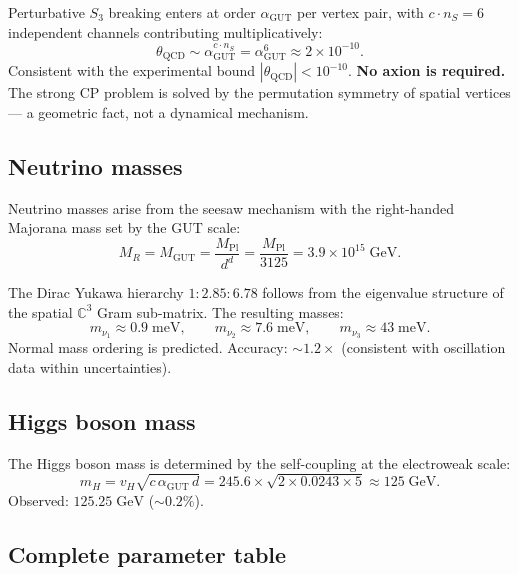 \documentclass[12pt]{article}
\theoremstyle{remark}
\theoremstyle{definition}
\begin{document}
Perturbative $S_3$ breaking enters at order $\alpha_\text{GUT}$ per vertex pair, with $c \cdot n_S = 6$ independent channels contributing multiplicatively:
\begin{equation}
\theta_\text{QCD} \sim \alpha_\text{GUT}^{c \cdot n_S} = \alpha_\text{GUT}^6 \approx 2 \times 10^{-10}.
\end{equation}
Consistent with the experimental bound $|\theta_\text{QCD}| < 10^{-10}$. \textbf{No axion is required.} The strong CP problem is solved by the permutation symmetry of spatial vertices --- a geometric fact, not a dynamical mechanism.

\subsection{Neutrino masses}

Neutrino masses arise from the seesaw mechanism with the right-handed Majorana mass set by the GUT scale:
\begin{equation}
M_R = M_\text{GUT} = \frac{M_\text{Pl}}{d^d} = \frac{M_\text{Pl}}{3125} = 3.9 \times 10^{15}\;\text{GeV}.
\end{equation}

The Dirac Yukawa hierarchy $1 : 2.85 : 6.78$ follows from the eigenvalue structure of the spatial $\mathbb{C}^3$ Gram sub-matrix. The resulting masses:
\begin{equation}
m_{\nu_1} \approx 0.9\;\text{meV}, \qquad m_{\nu_2} \approx 7.6\;\text{meV}, \qquad m_{\nu_3} \approx 43\;\text{meV}.
\end{equation}
Normal mass ordering is predicted. Accuracy: $\sim 1.2\times$ (consistent with oscillation data within uncertainties).

\subsection{Higgs boson mass}

The Higgs boson mass is determined by the self-coupling at the electroweak scale:
\begin{equation}
m_H = v_H\sqrt{c\,\alpha_\text{GUT}\,d} = 245.6 \times \sqrt{2 \times 0.0243 \times 5} \approx 125\;\text{GeV}.
\end{equation}
Observed: $125.25\;\text{GeV}$ ($\sim 0.2\%$).

\subsection{Complete parameter table}
\end{document}
